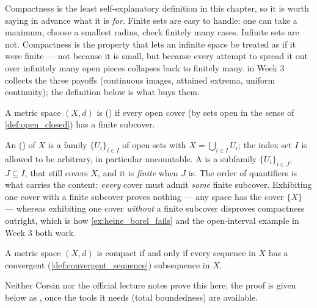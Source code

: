 Compactness is the least self-explanatory definition in this chapter, so it is worth saying in
advance what it is \emph{for}. Finite sets are easy to handle: one can take a maximum, choose a
smallest radius, check finitely many cases. Infinite sets are not. Compactness is the property
that lets an infinite space be treated as if it were finite --- not because it is small, but
because every attempt to spread it out over infinitely many open pieces collapses back to
finitely many.  in Week 3 collects the three payoffs
(continuous images, attained extrema, uniform continuity); the definition below is what buys
them.

\begin{definition}
\label{def:compact_metric_space}
A metric space $(X,d)$ is  () if every open cover
(by sets open in the sense of \cref{def:open_closed}) has a finite subcover.
\end{definition}

\begin{notation}
\label{not:open_cover}
An  () of $X$ is a family
$\{U_i\}_{i \in I}$ of open sets with $X = \bigcup_{i\in I}U_i$; the index set $I$ is allowed to
be arbitrary, in particular uncountable. A  is a subfamily
$\{U_i\}_{i \in J}$, $J \subseteq I$, that still covers $X$, and it is \emph{finite} when $J$
is. The order of quantifiers is what carries the content: \emph{every} cover must admit
\emph{some} finite subcover. Exhibiting one cover with a finite subcover proves nothing --- any
space has the cover $\{X\}$ --- whereas exhibiting one cover \emph{without} a finite subcover
disproves compactness outright, which is how \cref{ex:heine_borel_fails} and the
open-interval example in Week 3 both work.
\end{notation}


\begin{theorem}
\label{thm:sequential_compactness}
A metric space $(X,d)$ is compact if and only if every sequence in $X$ has a convergent
(\cref{def:convergent_sequence}) subsequence in $X$.
\end{theorem}

\begin{ainote}
Neither Corsin nor the official lecture notes prove this here; the proof is given below as
, once the tools it needs (total
boundedness) are available.
\end{ainote}

